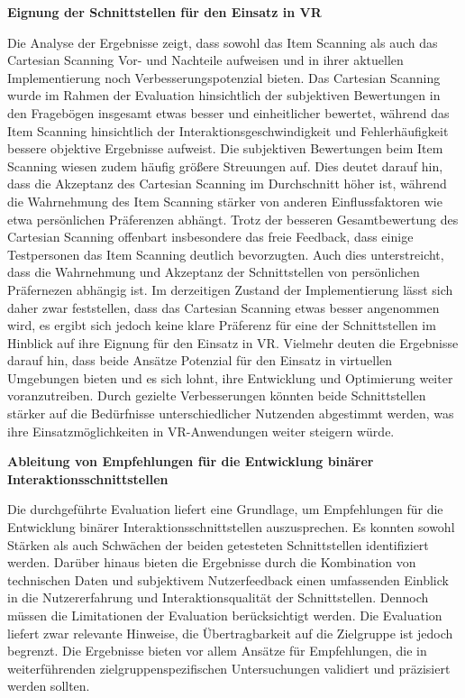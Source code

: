 \textbf{Eignung der Schnittstellen für den Einsatz in VR}

Die Analyse der Ergebnisse zeigt, dass sowohl das Item Scanning als auch das Cartesian Scanning Vor- und Nachteile aufweisen und in ihrer aktuellen Implementierung noch Verbesserungspotenzial bieten. Das Cartesian Scanning wurde im Rahmen der Evaluation hinsichtlich der subjektiven Bewertungen in den Fragebögen insgesamt etwas besser und einheitlicher bewertet, während das Item Scanning hinsichtlich der Interaktionsgeschwindigkeit und Fehlerhäufigkeit bessere objektive Ergebnisse aufweist. Die subjektiven Bewertungen beim Item Scanning wiesen zudem häufig größere Streuungen auf. Dies deutet darauf hin, dass die Akzeptanz des Cartesian Scanning im Durchschnitt höher ist, während die Wahrnehmung des Item Scanning stärker von anderen Einflussfaktoren wie etwa persönlichen Präferenzen abhängt.
Trotz der besseren Gesamtbewertung des Cartesian Scanning offenbart insbesondere das freie Feedback, dass einige Testpersonen das Item Scanning deutlich bevorzugten. Auch dies unterstreicht, dass die Wahrnehmung und Akzeptanz der Schnittstellen von persönlichen Präfernezen abhängig ist.
Im derzeitigen Zustand der Implementierung lässt sich daher zwar feststellen, dass das Cartesian Scanning etwas besser angenommen wird, es ergibt sich jedoch keine klare Präferenz für eine der Schnittstellen im Hinblick auf ihre Eignung für den Einsatz in VR. Vielmehr deuten die Ergebnisse darauf hin, dass beide Ansätze Potenzial für den Einsatz in virtuellen Umgebungen bieten und es sich lohnt, ihre Entwicklung und Optimierung weiter voranzutreiben. Durch gezielte Verbesserungen könnten beide Schnittstellen stärker auf die Bedürfnisse unterschiedlicher Nutzenden abgestimmt werden, was ihre Einsatzmöglichkeiten in VR-Anwendungen weiter steigern würde.

\textbf{Ableitung von Empfehlungen für die Entwicklung binärer Interaktionsschnittstellen}

Die durchgeführte Evaluation liefert eine Grundlage, um Empfehlungen für die Entwicklung binärer Interaktionsschnittstellen auszusprechen. Es konnten sowohl Stärken als auch Schwächen der beiden getesteten Schnittstellen identifiziert werden. Darüber hinaus bieten die Ergebnisse durch die Kombination von technischen Daten und subjektivem Nutzerfeedback einen umfassenden Einblick in die Nutzererfahrung und Interaktionsqualität der Schnittstellen. Dennoch müssen die Limitationen der Evaluation berücksichtigt werden. Die Evaluation liefert zwar relevante Hinweise, die Übertragbarkeit auf die Zielgruppe ist jedoch begrenzt. Die Ergebnisse bieten vor allem Ansätze für Empfehlungen, die in weiterführenden zielgruppenspezifischen Untersuchungen validiert und präzisiert werden sollten. 

